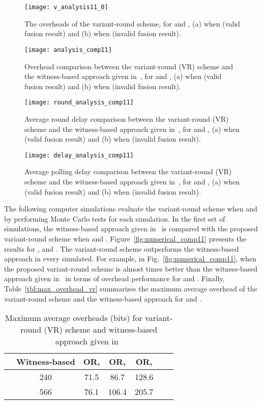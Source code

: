 \documentclass[12pt, onecolumn, draftcls]{IEEEtran}
\begin{document}
\begin{figure}
\centering
\texttt{[image: v\_analysis11\_0]}
\caption{The overheads of the variant-round scheme, for  and
, (a) when  (valid fusion result) and (b) when 
(invalid fusion result).} \label{fig:v_analysis11_0}
\end{figure}
\begin{figure}
\centering
\texttt{[image: analysis\_comp11]}
\caption{Overhead comparison between the variant-round (VR) scheme
and the witness-based approach given in~\cite{du:assurance}, for
 and , (a) when  (valid fusion result) and (b)
when  (invalid fusion result).} \label{fig:analysis_comp11}
\end{figure}
\begin{figure}
\centering
\texttt{[image: round\_analysis\_comp11]}
\caption{Average round delay comparison between the variant-round
(VR) scheme and the witness-based approach given
in~\cite{du:assurance}, for  and , (a) when 
(valid fusion result) and (b) when  (invalid fusion result).}
\label{fig:round_analysis_comp11}
\end{figure}
\begin{figure}
\centering
\texttt{[image: delay\_analysis\_comp11]}
\caption{Average polling delay comparison between the variant-round
(VR) scheme and the witness-based approach given
in~\cite{du:assurance}, for  and , (a) when 
(valid fusion result) and (b) when  (invalid fusion result).}
\label{fig:delay_analysis_comp11}
\end{figure}

The following computer simulations evaluate the variant-round scheme
when  and  by performing  Monte Carlo
tests for each simulation. In the first set of simulations, the
witness-based approach given in~\cite{du:assurance} is compared with
the proposed variant-round scheme when  and
. Figure~\ref{fig:numerical_comp11} presents the results for
,  and . The variant-round scheme
outperforms the witness-based approach in every  simulated. For
example, in Fig.~\ref{fig:numerical_comp11}, when  the proposed
variant-round scheme is almost  times better than the
witness-based approach given in~\cite{du:assurance} in terms of
overhead performance for  and . Finally,
Table~\ref{tbl:max_overhead_vr} summarizes the maximum average
overhead of the variant-round scheme and the witness-based approach
for  and .

\begin{table}
\centering
\renewcommand{\arraystretch}{1.3}
\caption{Maximum average overheads (bits) for variant-round (VR)
scheme and witness-based approach given
in~{\protect\cite{du:assurance}}} \centering
\begin{tabular}{|c||c|c|c|c|c|c|}
\hline
 & Witness-based & OR,  & OR,  & OR,  \\
\hline
 & 240 & 71.5 & 86.7 & 128.6 \\
\hline
 & 566 & 76.1 & 106.4 & 205.7 \\
\hline
\end{tabular} \label{tbl:max_overhead_or}
\end{table}
\end{document}
